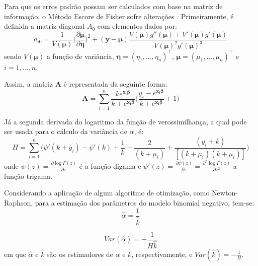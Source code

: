 \documentclass[12pt, a4paper, twoside]{report}
\numberwithin{equation}{section} %
\begin{document}
Para que os erros padrão possam ser calculados com base na matriz de informação, o Método Escore de Fisher sofre alterações \citep{hilbe2011}. Primeiramente, é definida a matriz diagonal $A_0$ com elementos dados por:
\begin{equation}\label{A0_bn}
a_{i0}=\frac{1}{V(\boldsymbol{\mu})} \biggl( \frac{\partial \boldsymbol{\mu}}{\partial \boldsymbol{\eta}} \biggl)^2 + (\boldsymbol{y}-\boldsymbol{\mu}) \frac{V(\boldsymbol{\mu})g''(\boldsymbol{\mu})+V'(\boldsymbol{\mu})g'(\boldsymbol{\mu})}{V(\boldsymbol{\mu})^2g'(\boldsymbol{\mu})^3}
\end{equation}
sendo $V(\boldsymbol{\mu})$ a função de variância, $\boldsymbol{\eta}=(\eta_1, ..., \eta_n)^\top$, $\boldsymbol{\mu} = (\mu_{1},...,\mu_{n})^\top$ e $i=1, ..., n$.

Assim, a matriz $\boldsymbol{A}$ é representada da seguinte forma:
\begin{equation}\label{A_bn}
\boldsymbol{A}=\sum \limits_{i=1}^{n} \frac{ke^{\boldsymbol{x_i\beta}}}{k+e^{\boldsymbol{x_i\beta}}} \biggl( \frac{y_i-e^{\boldsymbol{x_i\beta}}}{k+e^{\boldsymbol{x_i\beta}}}+1 \biggl)
\end{equation}

Já a segunda derivada do logaritmo da função de verossimilhança, a qual pode ser usada para o cálculo da variância de $\alpha$, é:
\begin{equation}\label{ll_derivada2_bn}
H= \sum \limits_{i=1}^{n} \biggl( \psi'(k+y_i) - \psi'(k) +\frac{1}{k}-\frac{2}{(k+\mu_i)}+\frac{(y_i+k)}{[(k+\mu_i)(k+\mu_i)]} \biggl)
\end{equation}
onde $ \psi (z)=\frac{\partial \log \Gamma(z)}{\partial z}$ é a função digama e $\psi'(z)=\frac{\partial \psi(z)}{\partial z}=\frac{\partial^2 \log \Gamma (z)}{\partial z^2}$ a função trigama.

Considerando a aplicação de algum algoritmo de otimização, como Newton-Raphson, para a estimação dos parâmetros do modelo binomial negativo, tem-se:
\begin{equation}\label{est_alpha}
\hat{\alpha}=\frac{1}{\hat{k}}
\end{equation}

\begin{equation}\label{var_est_alpha}
Var(\hat{\alpha})=-\frac{1}{H\hat{k}}
\end{equation}
em que $\hat{\alpha}$ e $\hat{k}$ são os estimadores de $\alpha$ e $k$, respectivamente, e $Var(\hat{k})=-\frac{1}{H}$.
\end{document}
